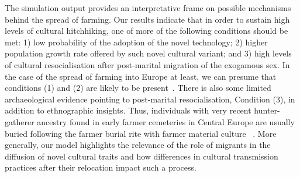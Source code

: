 \documentclass[9pt,twocolumn,twoside,lineno]{pnas-new}
\begin{document}
The simulation output provides an interpretative frame on possible mechanisms behind the spread of farming. Our results indicate that in order to sustain high levels of cultural hitchhiking, one of more of the following conditions should be met: 1) low probability of the adoption of the novel technology; 2) higher population growth rate offered by such novel cultural variant; and 3) high levels of cultural resocialisation after post-marital migration of the exogamous sex. In the case of the spread of farming into Europe at least, we can presume that conditions (1) and (2) are likely to be present~\citep{shennan2018first}. There is also some limited archaeological evidence pointing to post-marital resocialisation, Condition (3), in addition to ethnographic insights. Thus, individuals with very recent hunter-gatherer ancestry found in early farmer cemeteries in Central Europe are usually buried following the farmer burial rite with farmer material culture ~\citep{nikitin2019interactions,gelabert2023social}. More generally, our model highlights the relevance of the role of migrants in the diffusion of novel cultural traits and how differences in cultural transmission practices after their relocation impact such a process. 
\end{document}
